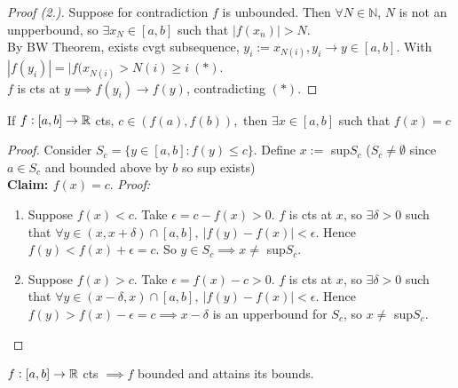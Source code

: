 \begin{proof}[Proof (2.)]
	Suppose for contradiction $f$ is unbounded. Then $\forall N \in \mathbb{N}$, $N$ is not an unpperbound, so $\exists x_N \in [a,b]$ such that $|f(x_n)| > N$.\\
By BW Theorem, exists cvgt subsequence, $y_i := x_{N(i)}, y_i \to y \in [a,b]$. With $|f(y_i)| = |f(x_{N(i)} > N(i) \geq i ~(*)$. \\ 
$f$ is cts at $y \implies f(y_i) \to f(y)$, contradicting $(*)$.  
\end{proof}\vspace*{5pt}






\begin{theorem} If $f: [a,b] \to \mathbb{R}$ cts, $c \in (f(a),f(b)),$ then $\exists x \in [a,b]$ such that $f(x) = c$
	
\end{theorem}
\begin{proof}
Consider $S_c = \{y \in [a,b] : f(y) \leq c\}$. Define $x:=$ sup$S_c$ ($S_c \neq \emptyset$ since $a \in S_c$ and bounded above by $b$ so sup exists)\\
\textbf{Claim: $f(x) = c$}. \textit{Proof:} \begin{enumerate}
 \item Suppose $f(x) < c$. Take $\epsilon = c-f(x) > 0$. $f$ is cts at $x$, so $\exists \delta > 0$ such that $\forall y \in (x,x+\delta) \cap [a,b], ~|f(y) - f(x)| < \epsilon$. Hence $f(y) < f(x) + \epsilon = c$. So $y\in S_c \implies x \neq$ sup$S_c$.
 \item 	Suppose $f(x) > c$. Take $\epsilon = f(x)-c > 0$. $f$ is cts at $x$, so $\exists \delta > 0$ such that $\forall y \in (x-\delta,x) \cap [a,b], ~|f(y) - f(x)| < \epsilon$. Hence $f(y) > f(x) - \epsilon = c \implies x- \delta$ is an upperbound for $S_c$, so $x \neq$ sup$S_c$. \qedhere
 \end{enumerate}
\end{proof}\vspace*{5pt}

\vspace*{5pt}
\begin{theorem} $f: [a,b] \to \mathbb{R}$ cts $\implies f$ bounded and attains its bounds.
\end{theorem}

